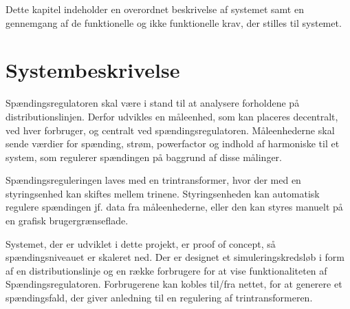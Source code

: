 
Dette kapitel indeholder en overordnet beskrivelse af systemet samt en gennemgang af de funktionelle og ikke funktionelle krav, der stilles til systemet. 

\section{Systembeskrivelse}
Spændingsregulatoren skal være i stand til at analysere forholdene på distributionslinjen. Derfor udvikles en måleenhed, som kan placeres decentralt, ved hver forbruger, og centralt ved spændingsregulatoren. Måleenhederne skal sende værdier for spænding, strøm, powerfactor og indhold af harmoniske til et system, som regulerer spændingen på baggrund af disse målinger. 

Spændingsreguleringen laves med en trintransformer, hvor der med en styringsenhed kan skiftes mellem trinene. Styringsenheden kan automatisk regulere spændingen jf. data fra måleenhederne, eller den kan styres manuelt på en grafisk brugergrænseflade. 

Systemet, der er udviklet i dette projekt, er proof of concept, så spændingsniveauet er skaleret ned.  Der er designet et simuleringskredsløb i form af en distributionslinje og en række forbrugere for at vise funktionaliteten af Spændingsregulatoren. Forbrugerene  kan kobles til/fra nettet, for at generere et spændingsfald, der giver anledning til en regulering af trintransformeren. 

